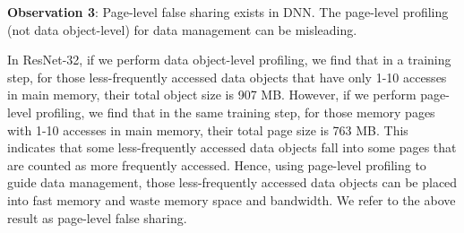 \textbf{Observation 3}: Page-level false sharing exists in DNN. The page-level profiling (not data object-level) for data management can be misleading. 

\textcolor{check}{In ResNet-32, if we perform data object-level profiling, we find that in a training step, for those less-frequently accessed data objects that have only 1-10 accesses in main memory, their total object size is 907 MB. However, if we perform page-level profiling, we find that in the same training step, for those memory pages with 1-10 accesses in main memory, their total page size is 763 MB.  This indicates that some less-frequently accessed data objects fall into some pages that are counted as more frequently accessed. Hence, using page-level profiling to guide data management, those less-frequently accessed data objects can be placed into fast memory and waste memory space and bandwidth. We refer to the above result as page-level false sharing. }


